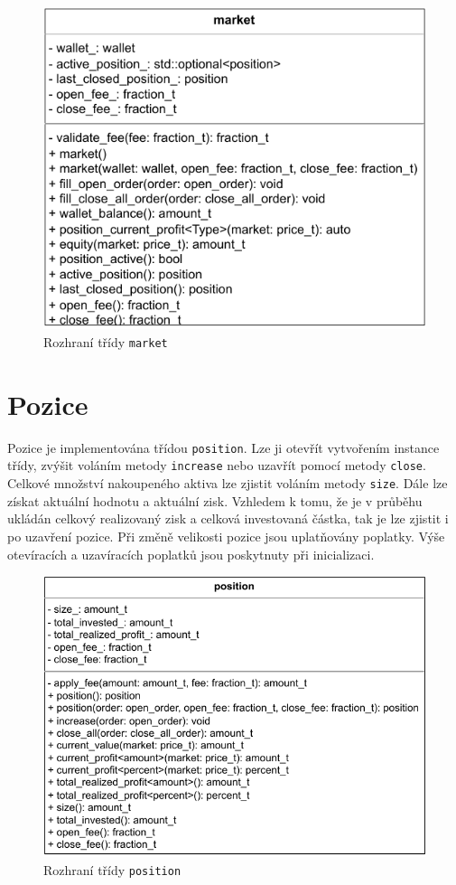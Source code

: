 \begin{figure}[htbp]
\centerline{\includegraphics[scale=0.85]{img/market-uml.pdf}}
\caption{Rozhraní třídy \texttt{market}}
\label{fig:market:uml}
\end{figure}

\section{Pozice}
Pozice je implementována třídou \texttt{position}.
Lze ji otevřít vytvořením instance třídy, zvýšit voláním metody \texttt{increase} nebo uzavřít pomocí metody \texttt{close}.
Celkové množství nakoupeného aktiva lze zjistit voláním metody \texttt{size}.
Dále lze získat aktuální hodnotu a aktuální zisk.
Vzhledem k tomu, že je v průběhu ukládán celkový realizovaný zisk a celková investovaná částka, tak je lze zjistit i po uzavření pozice.
Při změně velikosti pozice jsou uplatňovány poplatky.
Výše otevíracích a uzavíracích poplatků jsou poskytnuty při inicializaci.

\begin{figure}[htbp]
\centerline{\includegraphics[scale=0.85]{img/position-uml.pdf}}
\caption{Rozhraní třídy \texttt{position}}
\label{fig:position:uml}
\end{figure}

